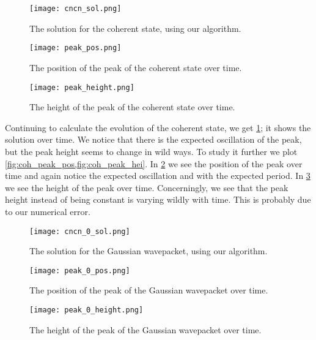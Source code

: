 \documentclass[10pt,a4paper,twocolumn]{article}
\begin{document}
\begin{figure}
    \centering
    \captionsetup{justification=centering}
    \texttt{[image: cncn\_sol.png]}
    \caption{The solution for the coherent state, using our algorithm.}
    \label{fig:coh_sol}
\end{figure}

\begin{figure}
    \centering
    \captionsetup{justification=centering}
    \texttt{[image: peak\_pos.png]}
    \caption{The position of the peak of the coherent state over time.}
    \label{fig:coh_peak_pos}
\end{figure}

\begin{figure}
    \centering
    \captionsetup{justification=centering}
    \texttt{[image: peak\_height.png]}
    \caption{The height of the peak of the coherent state over time.}
    \label{fig:coh_peak_hei}
\end{figure}

Continuing to calculate the evolution of the coherent state, we get \cref{fig:coh_sol}; it shows the solution over time. We notice that there is the expected oscillation of the peak, but the peak height seems to change in wild ways. To study it further we plot \cref{fig:coh_peak_pos,fig:coh_peak_hei}. In \cref{fig:coh_peak_pos} we see the position of the peak over time and again notice the expected oscillation and with the expected period. In \cref{fig:coh_peak_hei} we see the height of the peak over time. Concerningly, we see that the peak height instead of being constant is varying wildly with time. This is probably due to our numerical error.

\begin{figure}
    \centering
    \captionsetup{justification=centering}
    \texttt{[image: cncn\_0\_sol.png]}
    \caption{The solution for the Gaussian wavepacket, using our algorithm.}
    \label{fig:wp_sol}
\end{figure}

\begin{figure}
    \centering
    \captionsetup{justification=centering}
    \texttt{[image: peak\_0\_pos.png]}
    \caption{The position of the peak of the Gaussian wavepacket over time.}
    \label{fig:wp_peak_pos}
\end{figure}

\begin{figure}
    \centering
    \captionsetup{justification=centering}
    \texttt{[image: peak\_0\_height.png]}
    \caption{The height of the peak of the Gaussian wavepacket over time.}
    \label{fig:wp_peak_hei}
\end{figure}
\end{document}

